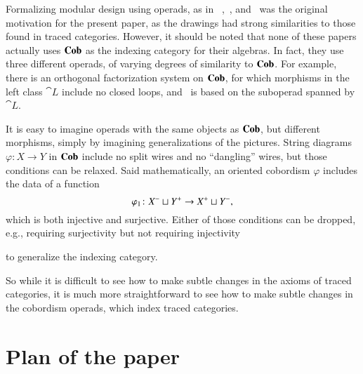 \documentclass[12pt,oneside,article,draft]{memoir}
\begin{document}
Formalizing modular design using operads, as in ~\cite{Spivak},~\cite{RupelSpivak}, and~\cite{VagnerSpivakLerman} was the original motivation for the present paper, as the drawings had strong similarities to those found in traced categories. However, it should be noted that none of these papers actually uses $\mathbf{Cob}$ as the indexing category for their algebras. In fact, they use three different operads, of varying degrees of similarity to $\mathbf{Cob}$. For example, there is an orthogonal factorization system on $\mathbf{Cob}$, for which morphisms in the left class $\cat{L}$ include no closed loops, and~\cite{VagnerSpivakLerman} is based on the suboperad spanned by $\cat{L}$.

It is easy to imagine operads with the same objects as $\mathbf{Cob}$, but different morphisms, simply by imagining generalizations of the pictures. String diagrams $\varphi\colon X\to Y$ in $\mathbf{Cob}$ include no split wires and no ``dangling'' wires, but those conditions can be relaxed. Said mathematically, an oriented cobordism $\varphi$ includes the data of a function
$$\varphi_1\colon X^-\sqcup Y^+\to X^+\sqcup Y^-,$$
which is both injective and surjective. Either of those conditions can be dropped, e.g., requiring surjectivity but not requiring injectivity
\begin{center}
\end{center}
to generalize the indexing category. 

So while it is difficult to see how to make subtle changes in the axioms of traced categories, it is much more straightforward to see how to make subtle changes in the cobordism operads, which index traced categories.

\section{Plan of the paper}
\end{document}
